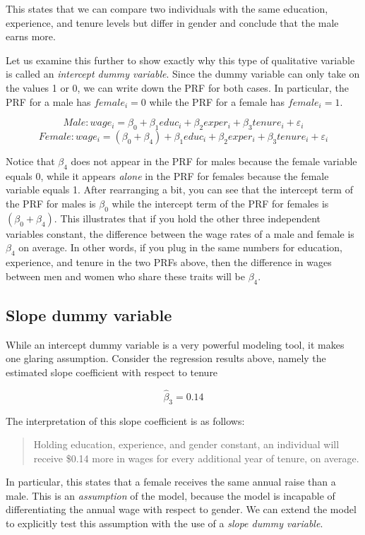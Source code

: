 \documentclass[
]{book}
\begin{document}
This states that we can compare two individuals with the same education, experience, and tenure levels but differ in gender and conclude that the male earns more.

Let us examine this further to show exactly why this type of qualitative variable is called an \emph{intercept dummy variable}. Since the dummy variable can only take on the values 1 or 0, we can write down the PRF for both cases. In particular, the PRF for a male has \(female_i = 0\) while the PRF for a female has \(female_i = 1\).

\[Male: wage_i=\beta_0+\beta_1educ_i+\beta_2exper_i+\beta_3tenure_i+\varepsilon_i\]
\[Female: wage_i=(\beta_0+\beta_4)+\beta_1educ_i+\beta_2exper_i+\beta_3tenure_i+\varepsilon_i\]

Notice that \(\beta_4\) does not appear in the PRF for males because the female variable equals 0, while it appears \emph{alone} in the PRF for females because the female variable equals 1. After rearranging a bit, you can see that the intercept term of the PRF for males is \(\beta_0\) while the intercept term of the PRF for females is \((\beta_0+\beta_4)\). This illustrates that if you hold the other three independent variables constant, the difference between the wage rates of a male and female is \(\beta_4\) on average. In other words, if you plug in the same numbers for education, experience, and tenure in the two PRFs above, then the difference in wages between men and women who share these traits will be \(\beta_4\).

\hypertarget{slope-dummy-variable}{%
\subsection{Slope dummy variable}\label{slope-dummy-variable}}

While an intercept dummy variable is a very powerful modeling tool, it makes one glaring assumption. Consider the regression results above, namely the estimated slope coefficient with respect to tenure

\[\hat{\beta}_3 = 0.14\]

The interpretation of this slope coefficient is as follows:

\begin{quote}
Holding education, experience, and gender constant, an individual will receive \$0.14 more in wages for every additional year of tenure, on average.
\end{quote}

In particular, this states that a female receives the same annual raise than a male. This is an \emph{assumption} of the model, because the model is incapable of differentiating the annual wage with respect to gender. We can extend the model to explicitly test this assumption with the use of a \emph{slope dummy variable}.
\end{document}
